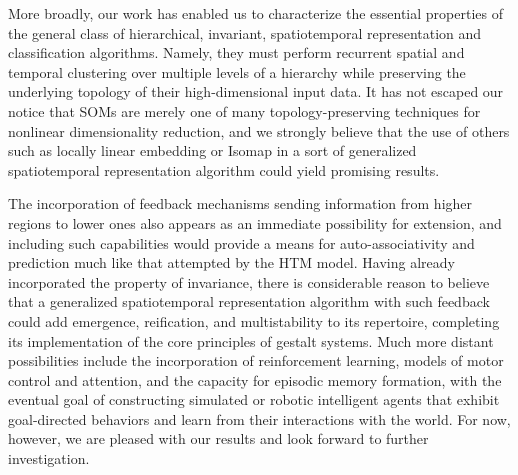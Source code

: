 \documentclass[a4paper,10pt]{article}
\begin{document}
More broadly, our work has enabled us to characterize the essential properties of the general class
of hierarchical, invariant, spatiotemporal representation and classification algorithms. Namely,
they must perform recurrent spatial and temporal clustering over multiple levels of a hierarchy
while preserving the underlying topology of their high-dimensional input data. It has not escaped
our notice that SOMs are merely one of many topology-preserving techniques for nonlinear
dimensionality reduction, and we strongly believe that the use of others such as locally linear
embedding or Isomap in a sort of generalized spatiotemporal representation algorithm could yield
promising results.

The incorporation of feedback mechanisms sending information from higher regions to lower ones also
appears as an immediate possibility for extension, and including such capabilities would provide a
means for auto-associativity and prediction much like that attempted by the HTM model.\cite{HTMAlgo,
OnIntelligence} Having already
incorporated the property of invariance, there is considerable reason to believe that a generalized
spatiotemporal representation algorithm with such feedback could add emergence, reification, and
multistability to its repertoire, completing its implementation of the core principles of gestalt
systems.\cite{HTMAlgo, OnIntelligence} Much more distant possibilities include the incorporation of
reinforcement learning, models of motor control and attention, and the capacity for episodic memory
formation, with the eventual goal of constructing simulated or robotic intelligent agents that
exhibit goal-directed behaviors and learn from their interactions with the
world.\cite{OnIntelligence} For now, however, we are pleased with our results and look forward to
further investigation.
\end{document}
